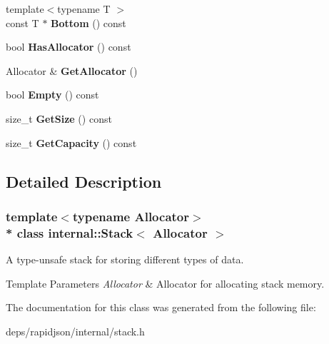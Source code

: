 \begin{DoxyCompactItemize}
\item 
{\footnotesize template$<$typename T $>$ }\\const T $\ast$ {\bfseries Bottom} () const \hypertarget{classinternal_1_1_stack_ae5057459b0f4cbb0cb6b541f99f60e07}{}\label{classinternal_1_1_stack_ae5057459b0f4cbb0cb6b541f99f60e07}

\item 
bool {\bfseries Has\+Allocator} () const \hypertarget{classinternal_1_1_stack_a6cd7033d53a1da185ea6dc2e15f7234c}{}\label{classinternal_1_1_stack_a6cd7033d53a1da185ea6dc2e15f7234c}

\item 
Allocator \& {\bfseries Get\+Allocator} ()\hypertarget{classinternal_1_1_stack_ab01f693833dfe136f574d66547623cfa}{}\label{classinternal_1_1_stack_ab01f693833dfe136f574d66547623cfa}

\item 
bool {\bfseries Empty} () const \hypertarget{classinternal_1_1_stack_abf57d1c7b356d8acbbe0e79147ca4b5c}{}\label{classinternal_1_1_stack_abf57d1c7b356d8acbbe0e79147ca4b5c}

\item 
size\+\_\+t {\bfseries Get\+Size} () const \hypertarget{classinternal_1_1_stack_ade4a25fa82950619652a30aa3a807f58}{}\label{classinternal_1_1_stack_ade4a25fa82950619652a30aa3a807f58}

\item 
size\+\_\+t {\bfseries Get\+Capacity} () const \hypertarget{classinternal_1_1_stack_a61dea1ed780c07bb438d17c581ab0e48}{}\label{classinternal_1_1_stack_a61dea1ed780c07bb438d17c581ab0e48}

\end{DoxyCompactItemize}


\subsection{Detailed Description}
\subsubsection*{template$<$typename Allocator$>$\\*
class internal\+::\+Stack$<$ Allocator $>$}

A type-\/unsafe stack for storing different types of data. 


\begin{DoxyTemplParams}{Template Parameters}
{\em Allocator} & Allocator for allocating stack memory. \\
\hline
\end{DoxyTemplParams}


The documentation for this class was generated from the following file\+:\begin{DoxyCompactItemize}
\item 
deps/rapidjson/internal/stack.\+h\end{DoxyCompactItemize}
